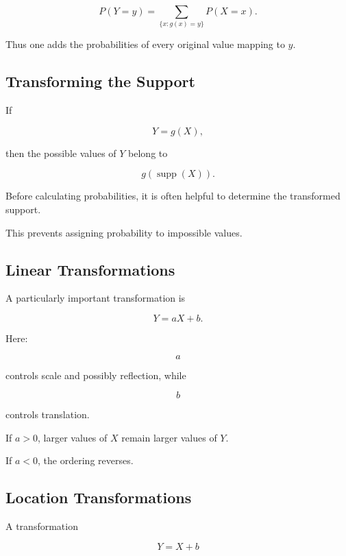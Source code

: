 \[
\boxed{
P(Y=y)
=
\sum_{\{x:g(x)=y\}}
P(X=x).
}
\]

Thus one adds the probabilities of every original value mapping to
\(y\).

\subsection{Transforming the Support}
\label{subsec:transforming-support}

If

\[
Y=g(X),
\]

then the possible values of \(Y\) belong to

\[
\boxed{
g(\operatorname{supp}(X)).
}
\]

Before calculating probabilities, it is often helpful to determine the
transformed support.

This prevents assigning probability to impossible values.

\subsection{Linear Transformations}
\label{subsec:linear-transformations-rv}

A particularly important transformation is

\[
\boxed{
Y=aX+b.
}
\]

Here:

\[
a
\]

controls scale and possibly reflection, while

\[
b
\]

controls translation.

If \(a>0\), larger values of \(X\) remain larger values of \(Y\).

If \(a<0\), the ordering reverses.

\subsection{Location Transformations}
\label{subsec:location-transformations}

A transformation

\[
Y=X+b
\]

